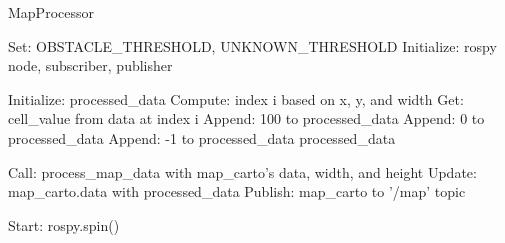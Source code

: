 \documentclass{article}
\begin{document}
\begin{algorithm}
\caption{MapProcessor}
\begin{algorithmic}[1]
\State Set: OBSTACLE\_THRESHOLD, UNKNOWN\_THRESHOLD
\State Initialize: rospy node, subscriber, publisher

    \State Initialize: processed\_data
        \State Compute: index i based on x, y, and width
        \State Get: cell\_value from data at index i
            \State Append: 100 to processed\_data
            \State Append: 0 to processed\_data
        \Else
            \State Append: -1 to processed\_data
        \EndIf
    \EndFor
    \State \Return processed\_data
\EndFunction

    \State Call: process\_map\_data with map\_carto's data, width, and height
    \State Update: map\_carto.data with processed\_data
    \State Publish: map\_carto to '/map' topic
\EndFunction

    \State Start: rospy.spin()
\EndFunction

\end{algorithmic}
\end{algorithm}
\end{document}
